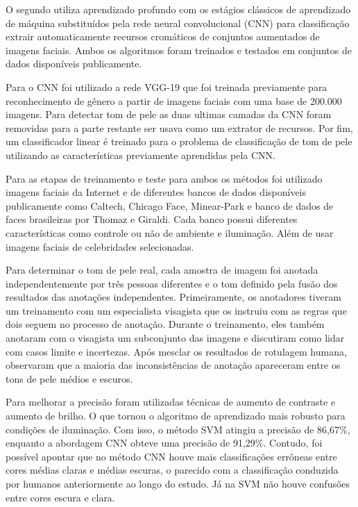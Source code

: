 O segundo utiliza aprendizado profundo com os
estágios clássicos de aprendizado de máquina substituídos
pela rede neural convolucional (CNN) para classificação  extrair automaticamente recursos cromáticos de conjuntos aumentados de imagens faciais. Ambos os algoritmos foram treinados e testados em conjuntos de dados disponíveis publicamente. 

Para o CNN foi utilizado a rede VGG-19 que foi treinada previamente para reconhecimento de gênero a partir de imagens faciais com uma base de 200.000 imagens. Para detectar tom de pele as duas ultimas camadas da CNN foram removidas para a parte restante ser usava como um extrator de recursos.  Por fim, um classificador linear é treinado para o problema de classificação de tom de pele utilizando as características previamente aprendidas pela CNN.

Para as etapas de treinamento e teste para ambos os métodos foi utilizado imagens faciais da Internet e de diferentes bancos de dados disponíveis publicamente como Caltech, Chicago Face, Minear-Park e banco de dados de faces brasileiras por Thomaz e Giraldi. Cada banco possui diferentes características como controle ou não de ambiente e iluminação. Além de usar imagens faciais de celebridades selecionadas.

Para determinar o tom de pele real, cada amostra de imagem foi anotada independentemente por três pessoas
diferentes e o tom definido pela fusão dos resultados das anotações independentes. Primeiramente, os anotadores tiveram um treinamento com um especialista visagista que os instruiu com as regras que dois seguem no processo de anotação. Durante o treinamento, eles também anotaram com o visagista um subconjunto das imagens e discutiram como lidar com casos limite e incertezas. Após mesclar os resultados de rotulagem humana, observaram que a maioria das
inconsistências de anotação apareceram entre os tons de pele médios e escuros.

Para melhorar a precisão foram utilizadas técnicas de aumento de contraste e aumento de brilho. O que tornou o algoritmo de aprendizado mais robusto para condições de iluminação. Com isso, o método SVM atingiu a precisão de 86,67\%, enquanto a abordagem CNN obteve uma precisão de 91,29\%. Contudo, foi possível apontar que no método CNN houve mais classificações errôneas entre cores médias claras e médias escuras, o parecido com a classificação conduzida por humanos anteriormente ao longo do estudo. Já na SVM não houve confusões entre cores escura e clara.

